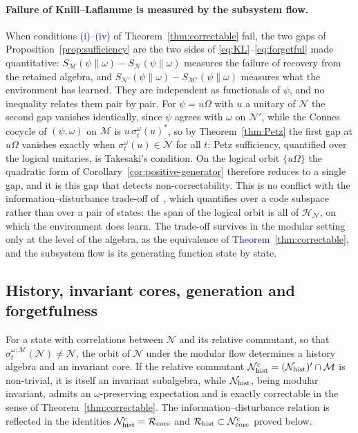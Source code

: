 \documentclass[a4paper,11pt]{article}
\theoremstyle{definition}
\newcommand{\mR}{\mathcal{R}}
\newcommand{\mN}{\mathcal{N}}
\newcommand{\mH}{\mathcal{H}}
\newcommand{\mM}{\mathcal{M}}
\newcommand{\NL}[1]{\textcolor{blue}{#1}}
\begin{document}
\paragraph{Failure of Knill--Laflamme is measured by the subsystem flow.}
When conditions \NL{(i)--(iv)} of Theorem~\ref{thm:correctable} fail, the two gaps of Proposition~\ref{prop:sufficiency}  are the two sides of \eqref{eq:KL}--\eqref{eq:forgetful} made quantitative: $S_{\mM}(\psi\|\omega)-S_{\mN}(\psi\|\omega)$ measures the failure of recovery from the retained algebra, and $S_{\mN'}(\psi\|\omega)-S_{\mM'}(\psi\|\omega)$ measures what the environment has learned. They are independent as functionals of $\psi$, and no inequality relates them pair by pair. For $\psi=u\Omega$ with $u$ a unitary of $\mN$ the second gap vanishes identically, since $\psi$ agrees with $\omega$ on $\mN'$, while the Connes cocycle of $(\psi,\omega)$ on $\mM$ is $u\,\sigma^\omega_t(u)^*$, so by Theorem~\ref{thm:Petz} the first gap at $u\Omega$ vanishes exactly when $\sigma^\omega_t(u)\in\mN$ for all $t$: Petz sufficiency, quantified over the logical unitaries, is Takesaki's condition. On the logical orbit $\{u\Omega\}$ the quadratic form of Corollary~\ref{cor:positive-generator} therefore reduces to a single gap, and it is this gap that detects non-correctability. This is no conflict with the information--disturbance trade-off of~\cite{KretschmannSchlingemannWerner2008}, which quantifies over a code subspace rather than over a pair of states: the span of the logical orbit is all of $\mH_{\mN}$, on which the environment does learn. The trade-off survives in the modular setting only at the level of the algebra, as the equivalence of \NL{Theorem}~\ref{thm:correctable}, and the subsystem flow is its generating function state by state.

\subsection{History, invariant cores, generation and forgetfulness}\label{subsec:QEC-history-memory}

For a state with correlations between $\mN$ and its relative commutant, so that $\sigma^{\omega;\mM}_t(\mN)\ne\mN$, the orbit of $\mN$ under the modular flow determines a history algebra and an invariant core. If the relative commutant $\mN_{\rm hist}^c=(\mN_{\rm hist})'\cap \mM$ is non-trivial, it is itself an invariant subalgebra, while $\mN_{\rm hist}$, being modular invariant, admits an $\omega$-preserving expectation and is exactly correctable in the sense of Theorem~\ref{thm:correctable}. The information--disturbance relation is reflected in the identities $\mN_{\rm hist}^c=\mR_{\rm core}$ and $\mR_{\rm hist}\subset \mN_{\rm core}^c$ proved below.
\end{document}
